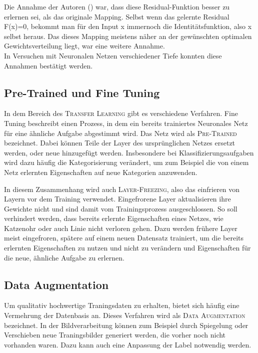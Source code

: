 Die Annahme der Autoren (\cite{DBLP:journals/corr/HeZRS15}) war, dass diese Residual-Funktion besser zu erlernen sei, als das originale Mapping. Selbst wenn das gelernte Residual F(x)=0, bekommt man für den Input x immernoch die Identitätsfunktion, also x selbst heraus. Das dieses Mapping meistens näher an der gewünschten optimalen Gewichtsverteilung liegt, war eine weitere Annahme.\\
In Versuchen mit Neuronalen Netzen verschiedener Tiefe konnten diese Annahmen bestätigt werden. 


\subsection{Pre-Trained und Fine Tuning}
In dem Bereich des \textsc{Transfer Learning} gibt es verschiedene Verfahren.
Fine Tuning beschreibt einen Prozess, in dem ein bereits trainiertes Neuronales Netz für eine ähnliche Aufgabe abgestimmt wird. Das Netz wird als \textsc{Pre-Trained} bezeichnet. Dabei können Teile der Layer des ursprünglichen Netzes ersetzt werden, oder neue hinzugefügt werden. Insbesondere bei Klassifizierungsaufgaben wird dazu häufig die Kategorisierung verändert, um zum Beispiel die von einem Netz erlernten Eigenschaften auf neue Kategorien anzuwenden.

In diesem Zusammenhang wird auch \textsc{Layer-Freezing}, also das einfrieren von Layern vor dem Training verwendet. Eingefrorene Layer aktualisieren ihre Gewichte nicht und sind damit vom Trainingsprozess ausgeschlossen. So soll verhindert werden, dass bereits erlernte Eigenschaften eines Netzes, wie \glqq Katzenohr \grqq{} oder auch \glqq Linie \grqq{} nicht verloren gehen. Dazu werden frühere Layer meist eingefroren, spätere auf einem neuen Datensatz trainiert, um die bereits erlernten Eigenschaften zu nutzen und nicht zu verändern und Eigenschaften für die neue, ähnliche Aufgabe zu erlernen.

\subsection{Data Augmentation}
Um qualitativ hochwertige Traningsdaten zu erhalten, bietet sich häufig eine Vermehrung der Datenbasis an. Dieses Verfahren wird als \textsc{Data Augmentation} bezeichnet. In der Bildverarbeitung können zum Beispiel durch Spiegelung oder Verschieben neue Traningsbilder generiert werden, die vorher noch nicht vorhanden waren. Dazu kann auch eine Anpassung der Label notwendig werden.

